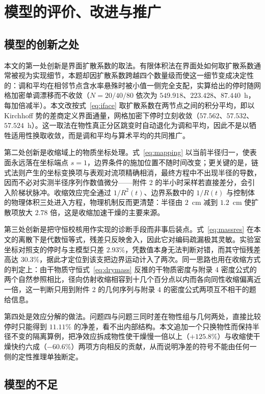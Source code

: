 \section{模型的评价、改进与推广}

\subsection{模型的创新之处}

本文的第一处创新是界面扩散系数的取法。有限体积法在界面处如何取扩散系数通常被视为实现细节，本题却因扩散系数跨越四个数量级而使这一细节变成决定性的：调和平均在相邻节点含水率悬殊时被小值一侧完全支配，实算给出的停时随网格加密单调漂移而不收敛（$N=20/40/80$ 依次为 $549.918$、$223.428$、$87.440$~h，每加倍减半）。本文改按式~\eqref{eq:iface} 取扩散系数在两节点之间的积分平均，即以 Kirchhoff 势的差商定义界面通量，网格加密下停时立刻收敛（$57.562$、$57.532$、$57.524$~h）。这一取法在物性真正分区跳变时自动退化为调和平均，因此不是以牺牲适用性换取收敛，而是调和平均与算术平均的共同推广。

第二处创新是收缩域上的物质坐标处理。式~\eqref{eq:mapping} 以当前半径归一，使表面永远落在坐标端点 $s=1$，边界条件的施加位置不随时间改变；更关键的是，链式法则产生的坐标变换项与表观对流项精确相消，最终方程中不出现半径的导数，因而不必对实测半径序列作数值微分——附件 2 的半小时采样若直接差分，会引入阶梯状脉冲。收缩效应完全通过 $1/R^2(t)$、边界系数中的 $1/R(t)$ 与控制体的物理体积三处进入方程，物理机制反而更清楚：半径由 $2$~cm 减到 $1.2$~cm 使扩散项放大 $2.78$ 倍，这是收缩加速干燥的主要来源。

第三处创新是把守恒校核用作实现的诊断手段而非事后装点。式~\eqref{eq:massres} 在本文的离散下是代数恒等式，残差只反映舍入，因此它对编码疏漏极其灵敏。实验室坐标对照支的停时与主模型只差 $2.93\%$，凭数值本身无法判断对错，而其守恒残差高达 $30.3\%$，据此才定位到该支把边界运动计入了两次。同一思路也用在收缩方式的判定上：由干物质守恒式~\eqref{eq:drymass} 反推的干物质密度与附录 4 密度公式的两个自然参照相比，径向仿射收缩相容到十几个百分点以内而各向同性收缩偏离近一倍，这一判断只用到附件 2 的几何序列与附录 4 的密度公式两项互不相干的题给信息。

第四处是效应分解的做法。问题四与问题三同时差在物性组与几何两处，直接比较停时只能得到 $11.11\%$ 的净差，看不出内部结构。本文追加一个只换物性而保持半径不变的隔离算例，把净效应拆成物性使干燥慢一倍以上（$+125.8\%$）与收缩使干燥快约六成（$-60.6\%$）两项方向相反的贡献，从而说明净差的符号不能由任何一侧的定性推理单独断定。

\subsection{模型的不足}

